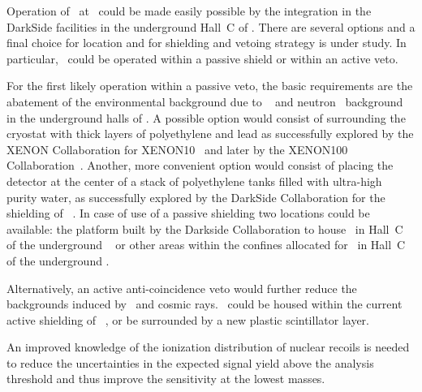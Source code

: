 Operation of \DSps\ at \LNGS\ could be made easily possible by the integration in the DarkSide facilities in the underground Hall~C of \LNGS.  There are several options and a final choice for location and for shielding and vetoing strategy is under study.  In particular, \DSps\ could be operated within a passive shield or within an active veto.

For the first likely operation within a passive veto, the basic requirements are the abatement of the environmental background due to \gr~\cite{Malczewski:2012gi} and neutron~\cite{Wulandari:2004hm} background in the underground halls of \LNGS.  A possible option would consist of surrounding the cryostat with thick layers of polyethylene and lead as successfully explored by the XENON Collaboration for XENON10~\cite{Angle:2008ki} and later by the XENON100 Collaboration~\cite{Aprile:2010jn}.  Another, more convenient option would consist of placing the detector at the center of a stack of polyethylene tanks filled with ultra-high purity water, as successfully explored by the DarkSide Collaboration for the shielding of \DSt~\cite{Alexander:2013jn}.  In case of use of a passive shielding two locations could be available: the platform built by the Darkside Collaboration to house \DSts\ in Hall~C of the underground \LNGS~\cite{Alexander:2013jn} or other areas within the confines allocated for \DSks\ in Hall~C of the underground \LNGS.

Alternatively, an active anti-coincidence veto would further reduce the backgrounds induced by \grs\ and cosmic rays.  \DSps\ could be housed within the current active shielding of \DSfs~\cite{Agnes:2016fz,Agnes:2015gu}, or be surrounded by a new plastic scintillator layer.  




An improved knowledge of the ionization distribution of nuclear recoils is needed to reduce the uncertainties in the expected signal yield above the analysis threshold and thus improve the sensitivity at the lowest masses.  


